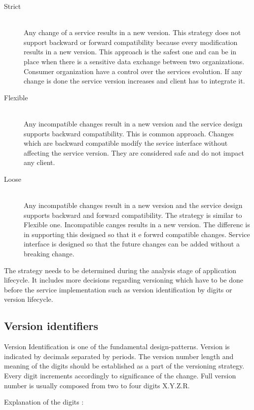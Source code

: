 \begin{description}
  \item[Strict]  \hfill \\
  Any change of a service results in a new version. This strategy does not support backward or forward compatibility because every modification results in a new version. This approach is the safest one and can be in place when there is a sensitive data exchange between two organizations. Consumer organization have a control over the services evolution. If any change is done the service version increases and client has to integrate it. 
  \item[Flexible] \hfill \\
  Any incompatible changes result in a new version and the service design supports backward compatibility. This is common approach. Changes which are backward compatible modify the sevice interface without affecting the service version. They are considered safe and do not impact any client.
  \item[Loose] \hfill \\
  Any incompatible changes result in a new version and the service design supports backward and forward compatibility. The strategy is similar to Flexible one. Incompatible canges results in a new version. The differenc is in supporting this designed so that it e forwrd compatible changes. Service interface is designed so that the future changes can be added without a breaking change.
\end{description}

The strategy needs to be determined during the analysis stage of application lifecycle. It includes more decisions regarding versioning which have to be done before the service implementation such as version identification by digits or version lifecycle.

\subsection{Version identifiers}
\label{subsec:versionid}
Version Identification is one of the fundamental \gls{design-patterns}. Version is indicated by decimals separated by periods. The version number length and meaning of the digits should be established as a part of the versioning strategy. Every digit increments accordingly to significance of the change. Full version number is usually composed from two to four digits X.Y.Z.R.

Explanation of the digits \cite{soa-governance}:

